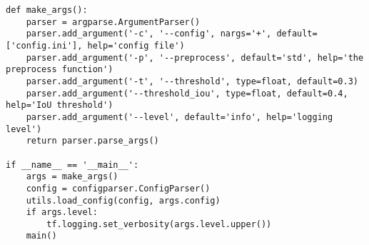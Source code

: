 \begin{lstlisting}
def make_args():
    parser = argparse.ArgumentParser()
    parser.add_argument('-c', '--config', nargs='+', default=['config.ini'], help='config file')
    parser.add_argument('-p', '--preprocess', default='std', help='the preprocess function')
    parser.add_argument('-t', '--threshold', type=float, default=0.3)
    parser.add_argument('--threshold_iou', type=float, default=0.4, help='IoU threshold')
    parser.add_argument('--level', default='info', help='logging level')
    return parser.parse_args()

if __name__ == '__main__':
    args = make_args()
    config = configparser.ConfigParser()
    utils.load_config(config, args.config)
    if args.level:
        tf.logging.set_verbosity(args.level.upper())
    main()


\end{lstlisting}
